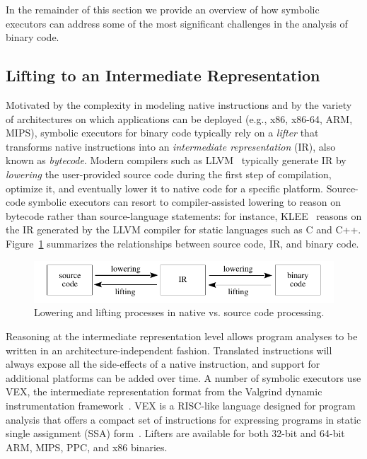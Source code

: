 In the remainder of this section we provide an overview of how symbolic executors can address some of the most significant challenges in the analysis of binary code.

\subsection{Lifting to an Intermediate Representation}
Motivated by the complexity in modeling native instructions and by the variety of architectures on which applications can be deployed (e.g., x86, x86-64, ARM, MIPS), symbolic executors for binary code typically rely on a {\em lifter} that transforms native instructions into an {\em intermediate representation} (IR), also known as {\em bytecode}. Modern compilers such as LLVM~\cite{LLVM-CGO04} typically generate IR by {\em lowering} the user-provided source code during the first step of compilation, optimize it, and eventually lower it to native code for a specific platform. Source-code symbolic executors can resort to compiler-assisted lowering to reason on bytecode rather than source-language statements: for instance, {\sc KLEE}~\cite{KLEE-OSDI08} reasons on the IR generated by the LLVM compiler for static languages such as C and C++. Figure~\ref{fig:lowering} summarizes the relationships between source code, IR, and binary code. %

\begin{figure}[t!]
  \centering
  \includegraphics[width=.7\columnwidth]{images/compiler}
  \caption{\label{fig:lowering} Lowering and lifting processes in native vs. source code processing.}
\end{figure}

Reasoning at the intermediate representation level allows program analyses to be written in an architecture-independent fashion. Translated instructions will always expose all the side-effects of a native instruction, and support for additional platforms can be added over time. A number of symbolic executors use VEX, the intermediate representation format from the Valgrind dynamic instrumentation framework~\cite{VALGRIND-PLDI07}. VEX is a RISC-like language designed for program analysis that offers a compact set of instructions for expressing programs in static single assignment (SSA) form~\cite{SSA-TOPLAS91}. Lifters are available for both 32-bit and 64-bit ARM, MIPS, PPC, and x86 binaries.

